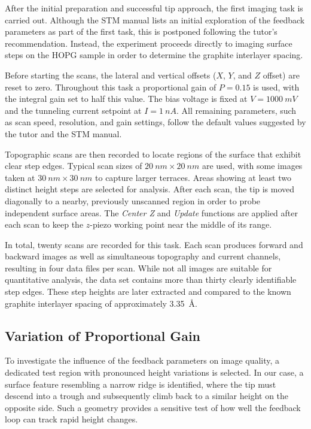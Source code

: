 \documentclass[a4paper]{article}
\begin{document}
After the initial preparation and successful tip approach, the first imaging task is carried out.
Although the STM manual lists an initial exploration of the feedback parameters as part of the first task, this is postponed following the tutor’s recommendation.
Instead, the experiment proceeds directly to imaging surface steps on the HOPG sample in order to determine the graphite interlayer spacing.

Before starting the scans, the lateral and vertical offsets ($X$, $Y$, and $Z$ offset) are reset to zero.
Throughout this task a proportional gain of $P = 0.15$ is used, with the integral gain set to half this value.
The bias voltage is fixed at $V = \SI{1000}{mV}$ and the tunneling current setpoint at $I = \SI{1}{nA}$.
All remaining parameters, such as scan speed, resolution, and gain settings, follow the default values suggested by the tutor and the STM manual.

Topographic scans are then recorded to locate regions of the surface that exhibit clear step edges.
Typical scan sizes of $20~\si{nm} \times 20~\si{nm}$ are used, with some images taken at
$30~\si{nm} \times 30~\si{nm}$ to capture larger terraces.
Areas showing at least two distinct height steps are selected for analysis.
After each scan, the tip is moved diagonally to a nearby, previously unscanned region in order to probe independent surface areas.
The \emph{Center Z} and \emph{Update} functions are applied after each scan to keep the $z$-piezo working point near the middle of its range.

In total, twenty scans are recorded for this task.
Each scan produces forward and backward images as well as simultaneous topography and current channels, resulting in four data files per scan.
While not all images are suitable for quantitative analysis, the data set contains more than thirty clearly identifiable step edges.
These step heights are later extracted and compared to the known graphite interlayer spacing of approximately \SI{3.35}{\angstrom}.

\subsection{Variation of Proportional Gain}

To investigate the influence of the feedback parameters on image quality, a dedicated test region with pronounced height variations is selected.
In our case, a surface feature resembling a narrow ridge is identified, where the tip must descend into a trough and subsequently climb back to a similar height on the opposite side.
Such a geometry provides a sensitive test of how well the feedback loop can track rapid height changes.
\end{document}
